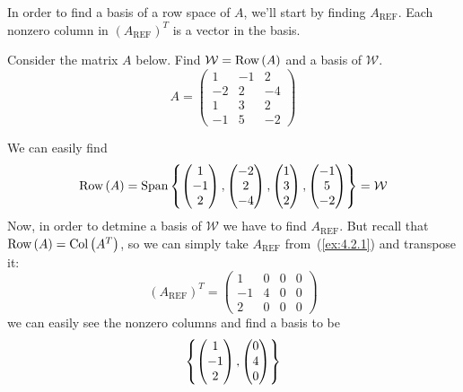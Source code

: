 In order to find a basis of a row space of $A$, we'll start by finding $A_{\text{REF}}$. Each nonzero column in $\left(A_{\text{REF}}\right)^{T}$ is a vector in the basis.
\begin{example}{}{}{\label{ex:4.2.1}}
    Consider the matrix $A$ below. Find $\mathcal{W}=\text{Row}\left(A\right)$ and a basis of $\mathcal{W}$.
    \[
        A = \begin{pmatrix}
            1 & -1 & 2 \\
            -2 & 2 & -4 \\
            1 & 3 & 2 \\
            -1 & 5 & -2
        \end{pmatrix} 
    \]
    \begin{solution}
        We can easily find
        \[
            \text{Row}\left(A\right) = \text{Span}\left\{
                \begin{pmatrix}
                    1 \\ -1 \\ 2
                \end{pmatrix},
                \begin{pmatrix}
                    -2 \\ 2 \\ -4
                \end{pmatrix},
                \begin{pmatrix}
                    1 \\ 3 \\ 2
                \end{pmatrix},
                \begin{pmatrix}
                    -1 \\ 5 \\ -2
                \end{pmatrix}
             \right\} = \mathcal{W}
        \]
        Now, in order to detmine a basis of $\mathcal{W}$ we have to find $A_{\text{REF}}$. But recall that $\text{Row}\left(A\right) = \text{Col}\left(A^T\right)$, so we can simply take $A_{\text{REF}}$ from~(\ref{ex:4.2.1}) and transpose it:
        \[
            \left(A_{\text{REF}}\right)^{T} = \begin{pmatrix}
                1 & 0 & 0 & 0 \\
                -1 & 4 & 0 & 0 \\
                2 & 0 & 0 & 0
            \end{pmatrix}
        \]
        we can easily see the nonzero columns and find a basis to be 
        \[
            \left\{\begin{pmatrix}
                1 \\ -1 \\ 2
            \end{pmatrix}, 
            \begin{pmatrix}
                0 \\ 4 \\ 0
            \end{pmatrix} \right\}
        \]
    \end{solution}
\end{example}

